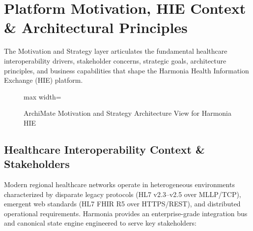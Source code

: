 
\chapter{Platform Motivation, HIE Context \& Architectural Principles}
\label{chap:foundations}

The Motivation and Strategy layer articulates the fundamental healthcare interoperability drivers, stakeholder concerns, strategic goals, architecture principles, and business capabilities that shape the Harmonia Health Information Exchange (HIE) platform.

\begin{figure}[htbp]
    \centering
    \begin{adjustbox}{max width=\textwidth}
        
    \end{adjustbox}
    \caption{ArchiMate Motivation and Strategy Architecture View for Harmonia HIE}
    \label{fig:foundations_motivation_map}
\end{figure}

\section{Healthcare Interoperability Context \& Stakeholders}

Modern regional healthcare networks operate in heterogeneous environments characterized by disparate legacy protocols (HL7 v2.3--v2.5 over MLLP/TCP), emergent web standards (HL7 FHIR R5 over HTTPS/REST), and distributed operational requirements. Harmonia provides an enterprise-grade integration bus and canonical state engine engineered to serve key stakeholders:


